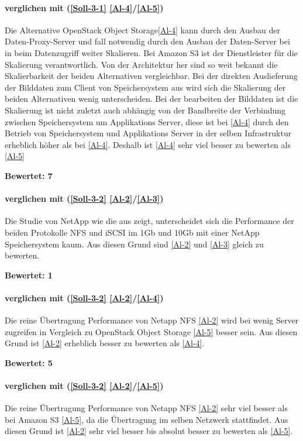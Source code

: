 \paragraph*{  verglichen mit  (\ref{Soll-3-1} \ref{Al-4}/\ref{Al-5})}
Die Alternative OpenStack Object Storage\ref{Al-4} kann durch den Ausbau der Daten-Proxy-Server und fall notwendig durch den Ausbau der Daten-Server bei in beim Datenzugriff weiter Skalieren. Bei Amazon S3 ist der Dienstleister für die Skalierung verantwortlich. Von der Architektur her sind so weit bekannt die Skalierbarkeit der beiden Alternativen vergleichbar. Bei der direkten Auslieferung der Bilddaten zum Client von Speichersystem aus wird sich die Skalierung der beiden Alternativen wenig unterscheiden. Bei der bearbeiten der Bilddaten ist die Skalierung ist nicht zuletzt auch abhängig von der Bandbreite der Verbindung zwischen Speichersystem um Applikations Server, diese ist bei \ref{Al-4} durch den Betrieb von Speichersystem und Applikations Server in der selben Infrastruktur erheblich höher als bei \ref{Al-4}. Deshalb ist  \ref{Al-4} sehr viel besser zu bewerten als  \ref{Al-5}

\textbf{Bewertet: 7}


\paragraph*{  verglichen mit  (\ref{Soll-3-2} \ref{Al-2}/\ref{Al-3})}
Die Studie von NetApp wie die  aus  zeigt, unterscheidet sich die Performance der beiden Protokolle NFS und iSCSI im 1Gb und 10Gb mit einer NetApp Speichersystem kaum. Aus diesen Grund sind \ref{Al-2} und \ref{Al-3} gleich zu bewerten.

\textbf{Bewertet: 1}

\paragraph*{  verglichen mit  (\ref{Soll-3-2} \ref{Al-2}/\ref{Al-4})}
Die reine Übertragung Performance von Netapp NFS \ref{Al-2} wird bei wenig Server zugreifen in Vergleich zu OpenStack Object Storage \ref{Al-5} besser sein. Aus diesen Grund ist \ref{Al-2} erheblich besser zu bewerten als \ref{Al-4}.
 
\textbf{Bewertet: 5}

\paragraph*{  verglichen mit  (\ref{Soll-3-2} \ref{Al-2}/\ref{Al-5})}
Die reine Übertragung Performance von Netapp NFS \ref{Al-2} sehr viel besser als bei Amazon S3 \ref{Al-5}, da die Übertragung im selben Netzwerk stattfindet. Aus diesen Grund ist \ref{Al-2} sehr viel besser bis absolut besser zu bewerten als \ref{Al-5}.

